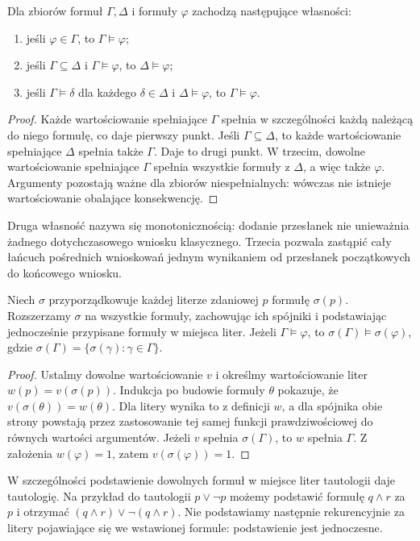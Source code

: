 \begin{stwierdzenie}
\label{prop:lst-propositional-consequence-properties}
Dla zbiorów formuł $\Gamma,\Delta$ i formuły $\varphi$
zachodzą następujące własności:
\begin{enumerate}
 \item jeśli $\varphi\in\Gamma$, to $\Gamma\models\varphi$;
 \item jeśli $\Gamma\subseteq\Delta$ i $\Gamma\models\varphi$,
       to $\Delta\models\varphi$;
 \item jeśli $\Gamma\models\delta$ dla każdego $\delta\in\Delta$
       i $\Delta\models\varphi$, to $\Gamma\models\varphi$.
\end{enumerate}
\end{stwierdzenie}
\begin{proof}
Każde wartościowanie spełniające $\Gamma$ spełnia w szczególności
każdą należącą do niego formułę, co daje pierwszy punkt.
Jeśli $\Gamma\subseteq\Delta$, to każde wartościowanie spełniające
$\Delta$ spełnia także $\Gamma$. Daje to drugi punkt.
W trzecim, dowolne wartościowanie spełniające $\Gamma$
spełnia wszystkie formuły z $\Delta$, a więc także $\varphi$.
Argumenty pozostają ważne dla zbiorów niespełnialnych:
wówczas nie istnieje wartościowanie obalające konsekwencję.
\end{proof}
Druga własność nazywa się monotonicznością: dodanie przesłanek
nie unieważnia żadnego dotychczasowego wniosku klasycznego.
Trzecia pozwala zastąpić cały łańcuch pośrednich wnioskowań
jednym wynikaniem od przesłanek początkowych do końcowego wniosku.

\begin{twierdzenie}
\label{thm:lst-propositional-substitution}
Niech $\sigma$ przyporządkowuje każdej literze zdaniowej $p$
formułę $\sigma(p)$. Rozszerzamy $\sigma$ na wszystkie formuły,
zachowując ich spójniki i podstawiając jednocześnie
przypisane formuły w miejsca liter. Jeżeli
$\Gamma\models\varphi$, to $\sigma(\Gamma)\models\sigma(\varphi)$,
gdzie $\sigma(\Gamma)=\{\sigma(\gamma):\gamma\in\Gamma\}$.
\end{twierdzenie}
\begin{proof}
Ustalmy dowolne wartościowanie $v$ i określmy wartościowanie
liter $w(p)=v(\sigma(p))$. Indukcja po budowie formuły $\theta$
pokazuje, że $v(\sigma(\theta))=w(\theta)$.
Dla litery wynika to z definicji $w$, a dla spójnika
obie strony powstają przez zastosowanie tej samej funkcji
prawdziwościowej do równych wartości argumentów.
Jeżeli $v$ spełnia $\sigma(\Gamma)$, to $w$ spełnia $\Gamma$.
Z założenia $w(\varphi)=1$, zatem $v(\sigma(\varphi))=1$.
\end{proof}
W szczególności podstawienie dowolnych formuł w miejsce liter
tautologii daje tautologię. Na przykład do tautologii
$p\lor\neg p$ możemy podstawić formułę $q\land r$ za $p$
i otrzymać $(q\land r)\lor\neg(q\land r)$.
Nie podstawiamy następnie rekurencyjnie za litery pojawiające się
we wstawionej formule: podstawienie jest jednoczesne.

